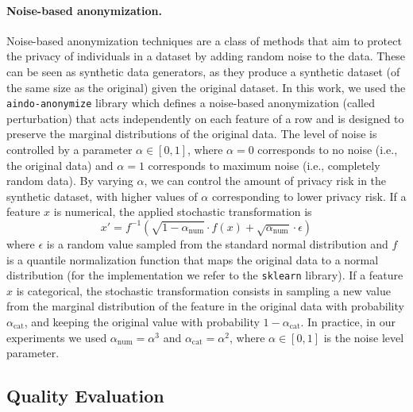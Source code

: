 \paragraph{Noise-based anonymization.}
Noise-based anonymization techniques are a class of methods that aim to protect the privacy of individuals in a dataset by adding random noise to the data. These can be seen as synthetic data generators, as they produce a synthetic dataset (of the same size as the original) given the original dataset.
In this work, we used the \texttt{aindo-anonymize} library \citep{aindo-anonymize} which defines a noise-based anonymization (called perturbation) that acts independently on each feature of a row and is designed to preserve the marginal distributions of the original data. The level of noise is controlled by a parameter $\alpha \in [0,1]$, where $\alpha=0$ corresponds to no noise (i.e., the original data) and $\alpha=1$ corresponds to maximum noise (i.e., completely random data). By varying $\alpha$, we can control the amount of privacy risk in the synthetic dataset, with higher values of $\alpha$ corresponding to lower privacy risk.
If a feature $x$ is numerical, the applied stochastic transformation is
\begin{equation}
x' = f^{-1}\left(\sqrt{1-\alpha_{\text{num}}} \cdot f(x) + \sqrt{\alpha_{\text{num}}} \cdot \epsilon\right)
\end{equation}
where $\epsilon$ is a random value sampled from the standard normal distribution and $f$ is a quantile normalization function that maps the original data to a normal distribution (for the implementation we refer to the \texttt{sklearn} library).
If a feature $x$ is categorical, the stochastic transformation consists in sampling a new value from the marginal distribution of the feature in the original data with probability $\alpha_{\text{cat}}$, and keeping the original value with probability $1-\alpha_{\text{cat}}$.
In practice, in our experiments we used $\alpha_{\text{num}} = \alpha^3$ and $\alpha_{\text{cat}} = \alpha^2$, where $\alpha \in [0,1]$ is the noise level parameter.


\subsection{Quality Evaluation}
\label{app:quality_evaluation}

